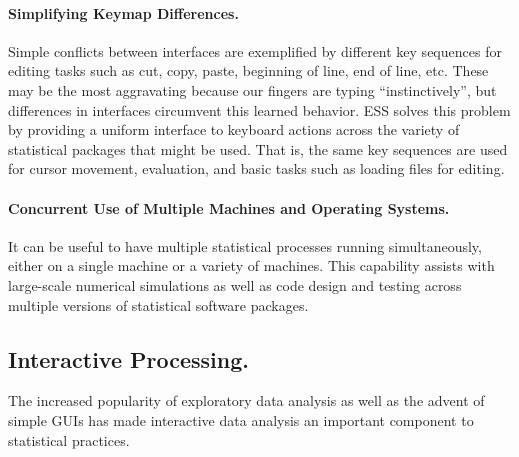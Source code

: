 \documentclass{article}
\begin{document}
\paragraph{Simplifying Keymap Differences.}
Simple conflicts between interfaces are exemplified by different
key sequences for editing tasks such as cut, copy, paste, beginning of
line, end of line, etc.  These may be the most aggravating because our
fingers are typing ``instinctively'', 
but differences in interfaces circumvent this learned
behavior.  ESS solves this problem by providing a uniform interface to
keyboard actions across the variety of statistical packages that
might be used.  That is, the same key sequences are used for cursor movement, 
evaluation, and basic tasks such as loading files for editing.


\paragraph{Concurrent Use of Multiple Machines and Operating Systems.}
It can be useful to have multiple statistical processes running
simultaneously, either on a single machine or a variety of machines.
This capability assists with large-scale numerical simulations 
as well as code design and testing across multiple
versions of statistical software packages.  
%

\subsection{Interactive Processing.}
\label{sec:interactive}

The increased popularity of exploratory data analysis as well as the
advent of simple GUIs has made interactive data analysis an important
component to statistical practices.  
\end{document}
